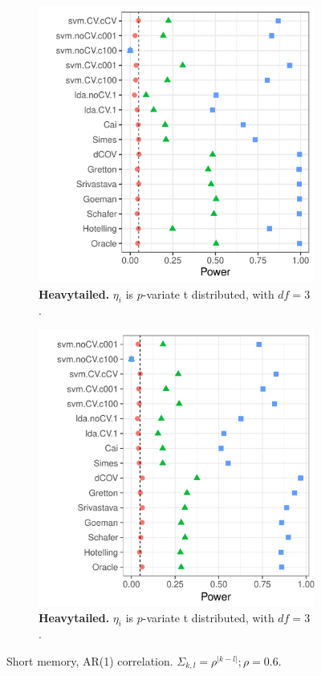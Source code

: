 \documentclass[oupdraft]{bio}
\begin{document}
\begin{figure}[h]
	\centering
	\begin{subfigure}[t]{.45\columnwidth}
		\centering
		\includegraphics[width=1\columnwidth]{"file2"}
		\caption{\textbf{Heavytailed.} $\eta_i$ is $p$-variate t distributed, with $df=3$ .  } 
	\end{subfigure}
	\begin{subfigure}[t]{.45\columnwidth}
		\centering
		\includegraphics[width=1\columnwidth]{"file9"}
		\caption{\textbf{Heavytailed.} $\eta_i$ is $p$-variate t distributed, with $df=3$ .  } 
	\end{subfigure}
	\caption{Short memory, AR(1) correlation. 
		$\Sigma_{k,l}=\rho^{|k-l|}; \rho=0.6$.}
	\label{fig:dependence_1}
\end{figure}
\end{document}
